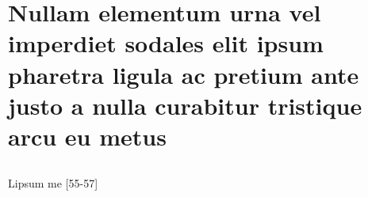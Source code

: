 

\chapter[Nullam elementum urna vel imperdiet sodales elit ipsum]{Nullam elementum urna vel imperdiet sodales elit ipsum pharetra ligula
    ac pretium ante justo a nulla curabitur tristique arcu eu metus}

\showfont
\section[Some encoding tests]{\showfont}
\subsection{\showfont}
\subsubsection{\showfont}
\subsubsubsection{\showfont}



Lipsum me [55-57]


